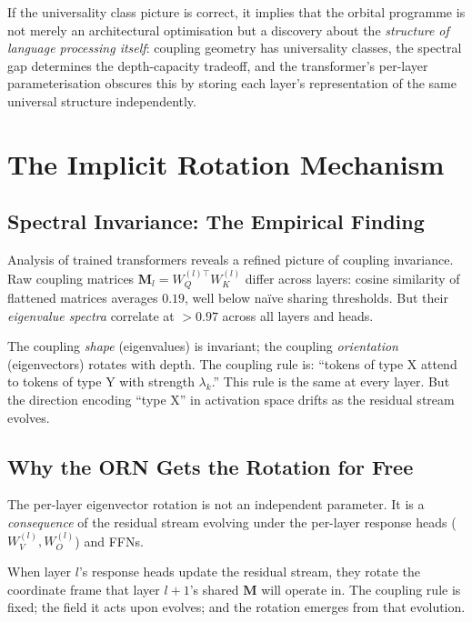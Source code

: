 \documentclass[11pt, a4paper]{article}
\newcommand{\M}{\mathbf{M}}
\theoremstyle{remark}
\begin{document}
If the universality class picture is correct, it implies that the orbital programme is not merely an architectural optimisation but a discovery about the \emph{structure of language processing itself}: coupling geometry has universality classes, the spectral gap determines the depth-capacity tradeoff, and the transformer's per-layer parameterisation obscures this by storing each layer's representation of the same universal structure independently.


\section{The Implicit Rotation Mechanism}
\label{sec:implicit-rotation}

\subsection{Spectral Invariance: The Empirical Finding}
\label{sec:scope}

Analysis of trained transformers reveals a refined picture of coupling invariance.
Raw coupling matrices $\M_l = W_Q^{(l)\top} W_K^{(l)}$ differ across layers: cosine similarity of flattened matrices averages $0.19$, well below na\"ive sharing thresholds.
But their \emph{eigenvalue spectra} correlate at $>0.97$ across all layers and heads.

The coupling \emph{shape} (eigenvalues) is invariant; the coupling \emph{orientation} (eigenvectors) rotates with depth.
The coupling rule is: ``tokens of type X attend to tokens of type Y with strength $\lambda_k$.''
This rule is the same at every layer.
But the direction encoding ``type X'' in activation space drifts as the residual stream evolves.

\subsection{Why the ORN Gets the Rotation for Free}

The per-layer eigenvector rotation is not an independent parameter.
It is a \emph{consequence} of the residual stream evolving under the per-layer response heads ($W_V^{(l)}, W_O^{(l)}$) and FFNs.

When layer $l$'s response heads update the residual stream, they rotate the coordinate frame that layer $l{+}1$'s shared $\M$ will operate in.
The coupling rule is fixed; the field it acts upon evolves; and the rotation emerges from that evolution.
\end{document}

